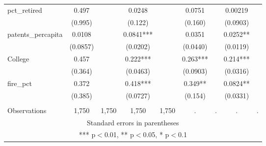 \begin{tabular}{lcccccccc}
pct\_retired & 0.497 &  & 0.0248 &  & 0.0751 &  & 0.00219 &  \\
 & (0.995) &  & (0.122) &  & (0.160) &  & (0.0903) &  \\
patents\_percapita & 0.0108 &  & 0.0841*** &  & 0.0351 &  & 0.0252** &  \\
 & (0.0857) &  & (0.0202) &  & (0.0440) &  & (0.0119) &  \\
College & 0.457 &  & 0.222*** &  & 0.263*** &  & 0.214*** &  \\
 & (0.364) &  & (0.0463) &  & (0.0903) &  & (0.0316) &  \\
fire\_pct & 0.372 &  & 0.418*** &  & 0.349** &  & 0.0824** &  \\
 & (0.385) &  & (0.0727) &  & (0.154) &  & (0.0331) &  \\
 &  &  &  &  &  &  &  &  \\
 Observations & 1,750 & 1,750 & 1,750 & 1,750 & . & . & . & . \\ \hline
\multicolumn{9}{c}{ Standard errors in parentheses} \\
\multicolumn{9}{c}{ *** p$<$0.01, ** p$<$0.05, * p$<$0.1} \\
\end{tabular}
